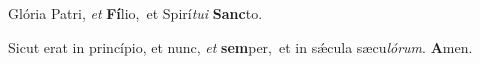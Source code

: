 \item Glória Patri, \textit{et} \textbf{Fí}lio,~\mediant et Spirí\textit{tu}\textit{i} \textbf{Sanc}to.

\item Sicut erat in princípio, et nunc, \textit{et} \textbf{sem}per,~\mediant et in sǽcula sæcu\textit{ló}\textit{rum}. \textbf{A}men.